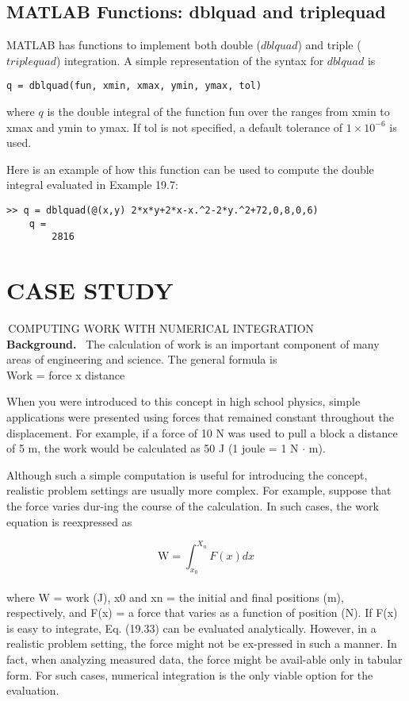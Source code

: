 \documentclass[../main.tex]{subfiles}
\begin{document}
\subsection{MATLAB Functions: dblquad and triplequad}
MATLAB has functions to implement both double ($dblquad$) and triple ($triplequad$)
integration. A simple representation of the syntax for $dblquad$ is

\begin{lstlisting}[numbers=none]
	q = dblquad(fun, xmin, xmax, ymin, ymax, tol)
\end{lstlisting}

where $q$ is the double integral of the function fun over the ranges from xmin to xmax and ymin to ymax. If tol is not specified, a default tolerance of $1 \times 10^{-6}$ is used.

Here is an example of how this function can be used to compute the double integral evaluated in Example 19.7:

\begin{lstlisting}[numbers=none]
	>> q = dblquad(@(x,y) 2*x*y+2*x-x.^2-2*y.^2+72,0,8,0,6)
	q =
		2816
\end{lstlisting}

\section*{{CASE STUDY}}\,COMPUTING WORK WITH NUMERICAL INTEGRATION \\

\large\textbf{Background.} \,  The calculation of work is an important
component of many areas of engineering and science. The general formula is\\

Work = force x distance

When you were introduced to this concept in high school physics, simple
applications were
presented using forces that remained constant throughout the displacement.
For example,
if a force of 10 N was used to pull a block a distance of 5 m, the work
would be calculated
as 50 J (1 joule = 1 N $\cdot$  m).


Although such a simple computation is useful for introducing the concept,
realistic
problem settings are usually more complex. For example, suppose that the
force varies dur-ing the course of the calculation. In such cases, the work
equation is reexpressed as

\begin{equation}
	\tag{19.33}
	\mathrm{W}=\int^{X_{n}}_{x_{0}}F(x)dx
\end{equation}\\
where W = work (J), x0 and xn = the initial and final positions (m), respectively, and F(x) =
a force that varies as a function of position (N). If F(x) is easy to integrate, Eq. (19.33) can
be evaluated analytically. However, in a realistic problem setting, the force might not be ex-pressed in such a manner. In fact, when analyzing measured data, the force might be avail-able only in tabular form. For such cases, numerical integration is the only viable option for
the evaluation.
\end{document}
